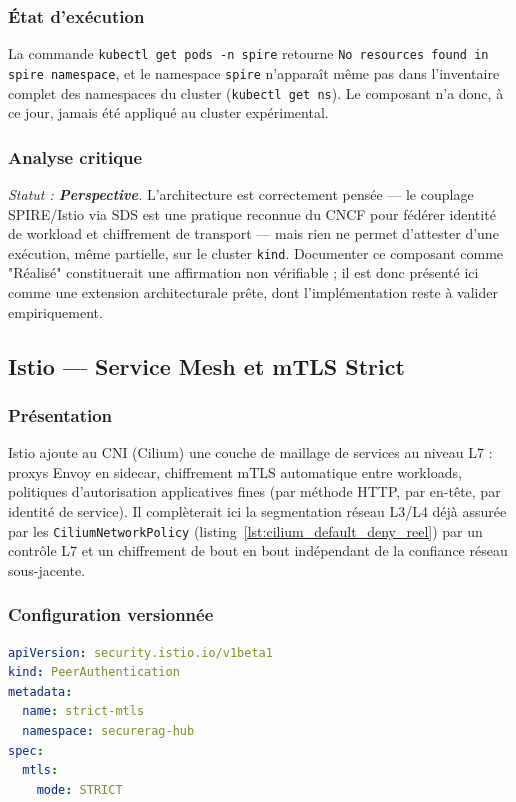 \subsubsection{État d'exécution}
La commande \texttt{kubectl get pods -n spire} retourne \texttt{No resources found in spire namespace}, et le namespace \texttt{spire} n'apparaît même pas dans l'inventaire complet des namespaces du cluster (\texttt{kubectl get ns}). Le composant n'a donc, à ce jour, jamais été appliqué au cluster expérimental.

\subsubsection{Analyse critique}
\textit{Statut : \textbf{Perspective}.} L'architecture est correctement pensée — le couplage SPIRE/Istio via SDS est une pratique reconnue du CNCF pour fédérer identité de workload et chiffrement de transport — mais rien ne permet d'attester d'une exécution, même partielle, sur le cluster \texttt{kind}. Documenter ce composant comme "Réalisé" constituerait une affirmation non vérifiable ; il est donc présenté ici comme une extension architecturale prête, dont l'implémentation reste à valider empiriquement.

\subsection{Istio — Service Mesh et mTLS Strict}
\label{subsec:istio_v2}

\subsubsection{Présentation}
Istio ajoute au CNI (Cilium) une couche de maillage de services au niveau L7 : proxys Envoy en sidecar, chiffrement mTLS automatique entre workloads, politiques d'autorisation applicatives fines (par méthode HTTP, par en-tête, par identité de service). Il complèterait ici la segmentation réseau L3/L4 déjà assurée par les \texttt{CiliumNetworkPolicy} (listing~\ref{lst:cilium_default_deny_reel}) par un contrôle L7 et un chiffrement de bout en bout indépendant de la confiance réseau sous-jacente.

\subsubsection{Configuration versionnée}
\begin{lstlisting}[language=yaml, caption={Extrait réel de la PeerAuthentication Istio en mode STRICT (\texttt{infra/k8s/istio/peerauthentication-strict.yaml})}, label={lst:istio_peerauth_reel}]
apiVersion: security.istio.io/v1beta1
kind: PeerAuthentication
metadata:
  name: strict-mtls
  namespace: securerag-hub
spec:
  mtls:
    mode: STRICT
\end{lstlisting}

